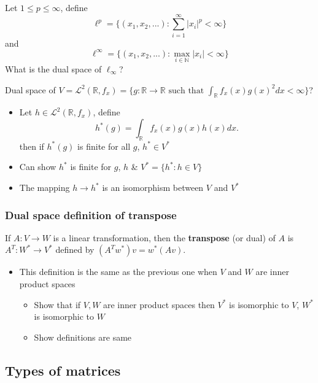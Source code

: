 \documentclass[compress]{beamer}
\def\R{\mathbb{R}}
\theoremstyle{definition}
\begin{document}
\begin{frame}
  \begin{example}
    Let $1 \leq p \leq \infty$, define 
    \[ \ell^p = \{ (x_1, x_2, ... ) : \sum_{i=1}^\infty |x_i|^p < \infty
    \} \]
    and 
    \[ \ell^\infty = \{(x_1, x_2, ... ) : \max_{i \in \mathbb{N}} |x_i| < \infty
    \} \]
    What is the dual space of $\ell_\infty$?  
  \end{example}
\end{frame}

\begin{frame}
\begin{example}
  Dual space of $V = \mathcal{L}^2(\R,f_x) = \{g:  \R \to \R \text{ such that } \int_{\R} f_x(x) g(x)^2 dx <
  \infty\}$? 
  \begin{itemize}
  \item Let $h \in \mathcal{L}^2(\R,f_x)$, define 
    \[ h^\ast(g) = \int_\R f_x(x) g(x) h(x) dx. \] 
    then if $h^\ast(g)$ is finite for all $g$, $h^\ast \in V^\ast$
  \item Can show $h^\ast$ is finite for $g$, $h$ \& $V^\ast = \{
    h^\ast : h \in V\}$
  \item The mapping $h \to h^\ast$ is an isomorphism between $V$ and
    $V^\ast$ 
  \end{itemize}
\end{example}
\end{frame}

\begin{frame}\frametitle{Dual space definition of transpose}
  \begin{definition}
    If $A: V \to W$ is a linear transformation, then the
    \textbf{transpose} (or dual) of $A$ is $A^T: W^\ast \to V^\ast$
    defined by $(A^Tw^\ast)v = w^\ast(Av)$.
  \end{definition}
  \begin{itemize}
  \item This definition is the same as the previous one when $V$ and
    $W$ are inner product spaces
    \begin{itemize}
    \item Show that if $V, W$ are inner product spaces then $V^\ast$ is
      isomorphic to $V$, $W^\ast$ is isomorphic to $W$
    \item Show definitions are same
    \end{itemize}
  \end{itemize}
\end{frame}


\subsection{Types of matrices}
\end{document}
